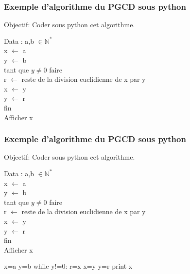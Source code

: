 \ifx\first\second
\begin{frame}[fragile]
\frametitle{Exemple d'algorithme du PGCD sous python}
Objectif: Coder sous python cet algorithme.

\begin{minipage}{0.48\linewidth}
Data : a,b $\in \mathbb{N}^*$\\
x $\leftarrow$ a \\
y $\leftarrow$ b \\
tant que $y\neq0$ faire \\
\hspace*{0.5cm} r $\leftarrow$ reste de la division euclidienne de x par y \\
\hspace*{0.5cm} x $\leftarrow$ y \\
\hspace*{0.5cm} y $\leftarrow$ r \\
fin \\
Afficher x
\end{minipage}\hfill
\begin{minipage}{0.48\linewidth}

\begin{GrayBox}[0.7\textwidth]
\vspace{4cm}
\end{GrayBox}

\end{minipage}

\end{frame}
\else
\begin{frame}[fragile]
\frametitle{Exemple d'algorithme du PGCD sous python}
Objectif: Coder sous python cet algorithme.

\begin{minipage}{0.48\linewidth}
Data : a,b $\in \mathbb{N}^*$\\
x $\leftarrow$ a \\
y $\leftarrow$ b \\
tant que $y\neq0$ faire \\
\hspace*{0.5cm} r $\leftarrow$ reste de la division euclidienne de x par y \\
\hspace*{0.5cm} x $\leftarrow$ y \\
\hspace*{0.5cm} y $\leftarrow$ r \\
fin \\
Afficher x
\end{minipage}\hfill
\begin{minipage}{0.48\linewidth}

\begin{GrayBox}[0.7\textwidth]
\begin{verbatimtab}[3]
x=a
y=b
while y!=0:
	r=x%
	x=y
	y=r
print x
\end{verbatimtab}
\end{GrayBox}

\end{minipage}

\end{frame}
\fi

